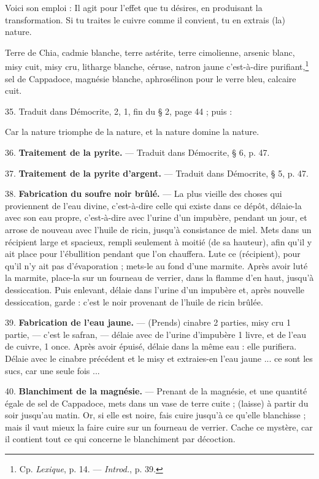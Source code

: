 \documentclass[a4paper, 11pt, oneside, polutonikogreek, french]{article}
\begin{document}
Voici son emploi : Il agit pour l'effet que tu désires, en produisant la transformation. Si tu traites le cuivre comme il convient, tu en extrais (la) nature.

Terre de Chia, cadmie blanche, terre astérite, terre cimolienne, arsenic blanc, misy cuit, misy cru, litharge blanche, céruse, natron jaune c'est-à-dire purifiant,\footnote{Cp. \emph{Lexique}, p. 14. --- \emph{Introd.}, p. 39.} sel de Cappadoce, magnésie blanche, aphrosélinon pour le verre bleu, calcaire cuit.

35. Traduit dans Démocrite, 2, 1, fin du § 2, page 44 ; puis :

Car la nature triomphe de la nature, et la nature domine la nature.

36. \textbf{Traitement de la pyrite.} --- Traduit dans Démocrite, § 6, p. 47.

37. \textbf{Traitement de la pyrite d'argent.} --- Traduit dans Démocrite, § 5, p. 47.

38. \textbf{Fabrication du soufre noir brûlé.} --- La plus vieille des choses qui proviennent de l'eau divine, c'est-à-dire celle qui existe dans ce dépôt, délaie-la avec son eau propre, c'est-à-dire avec l'urine d'un impubère, pendant un jour, et arrose de nouveau avec l'huile de ricin, jusqu'à consistance de miel. Mets dans un récipient large et spacieux, rempli seulement à moitié (de sa hauteur), afin qu'il y ait place pour l'ébullition pendant que l'on chauffera. Lute ce (récipient), pour qu'il n'y ait pas d'évaporation ; mets-le au fond d'une marmite. Après avoir luté la marmite, place-la sur un fourneau de verrier, dans la flamme d'en haut, jusqu'à dessiccation. Puis enlevant, délaie dans l'urine d'un impubère et, après nouvelle dessiccation, garde : c'est le noir provenant de l'huile de ricin brûlée.

39. \textbf{Fabrication de l'eau jaune.} --- (Prends) cinabre 2 parties, misy cru 1 partie, --- c'est le safran, --- délaie avec de l'urine d'impubère 1 livre, et de l'eau de cuivre, 1 once. Après avoir épuisé, délaie dans la même eau : elle purifiera. Délaie avec le cinabre précédent et le misy et extraies-en l'eau jaune ... ce sont les sucs, car une seule fois ...

40. \textbf{Blanchiment de la magnésie.} --- Prenant de la magnésie, et une quantité égale de sel de Cappadoce, mets dans un vase de terre cuite ; (laisse) à partir du soir jusqu'au matin. Or, si elle est noire, fais cuire jusqu'à ce qu'elle blanchisse ; mais il vaut mieux la faire cuire sur un fourneau de verrier. Cache ce mystère, car il contient tout ce qui concerne le blanchiment par décoction.
\end{document}
